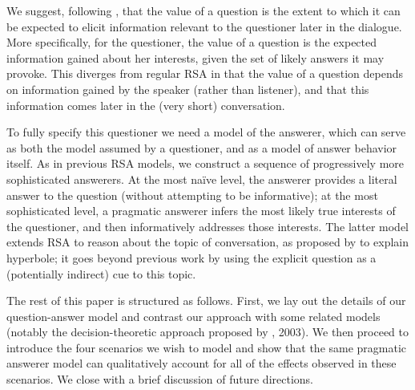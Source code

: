 \documentclass[10pt,letterpaper]{article}
\begin{document}
We suggest, following , that the value of a question is the extent to which it can be expected to elicit information relevant to the questioner later in the dialogue. 
More specifically, for the questioner, the value of a question is the expected information gained about her interests, given the set of likely answers it may provoke. 
This diverges from regular RSA in that the value of a question depends on information gained by the speaker (rather than listener), and that this information comes later in the (very short) conversation.

To fully specify this questioner we need a model of the answerer, which can serve as both the model assumed by a questioner, and as a model of answer behavior itself. As in previous RSA models, we construct a sequence of progressively more sophisticated answerers. At the most na\"ive level, the answerer provides a literal answer to the question (without attempting to be informative); at the most sophisticated level, a pragmatic answerer infers the most likely true interests of the questioner, and then informatively addresses those interests. The latter model extends RSA to reason about the topic of conversation, as proposed by  to explain hyperbole; it goes beyond previous work by using the explicit question as a (potentially indirect) cue to this topic. 


The rest of this paper is structured as follows. First, we lay out the details of our question-answer model and contrast our approach with some related models (notably the decision-theoretic approach proposed by \citeauthor{VanRooy03_QuestioningDecisionProblems}, 2003). We then proceed to introduce the four scenarios we wish to model and show that the same pragmatic answerer model can qualitatively account for all of the effects observed in these scenarios.
We close with a brief discussion of future directions.
\end{document}
